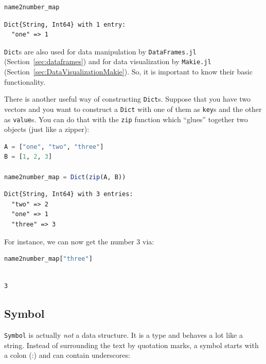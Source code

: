 \documentclass[
  notoc %
]{tufte-book}
\newcommand{\passthrough}[1]{#1}
\begin{document}
\begin{lstlisting}[language=Julia]
name2number_map
\end{lstlisting}

\begin{lstlisting}[language=Output]
Dict{String, Int64} with 1 entry:
  "one" => 1
\end{lstlisting}

\passthrough{\lstinline!Dict!}s are also used for data manipulation by
\passthrough{\lstinline!DataFrames.jl!} (Section~\ref{sec:dataframes})
and for data visualization by \passthrough{\lstinline!Makie.jl!}
(Section~\ref{sec:DataVisualizationMakie}). So, it is important to know
their basic functionality.

There is another useful way of constructing
\passthrough{\lstinline!Dict!}s. Suppose that you have two vectors and
you want to construct a \passthrough{\lstinline!Dict!} with one of them
as \passthrough{\lstinline!key!}s and the other as
\passthrough{\lstinline!value!}s. You can do that with the
\passthrough{\lstinline!zip!} function which ``glues'' together two
objects (just like a zipper):

\begin{lstlisting}[language=Julia]
A = ["one", "two", "three"]
B = [1, 2, 3]

name2number_map = Dict(zip(A, B))
\end{lstlisting}

\begin{lstlisting}[language=Output]
Dict{String, Int64} with 3 entries:
  "two" => 2
  "one" => 1
  "three" => 3
\end{lstlisting}

For instance, we can now get the number 3 via:

\begin{lstlisting}[language=Julia]
name2number_map["three"]
\end{lstlisting}

\begin{lstlisting}[language=Output]

3

\end{lstlisting}

\hypertarget{sec:symbol}{%
\subsection{Symbol}\label{sec:symbol}}

\passthrough{\lstinline!Symbol!} is actually \emph{not} a data
structure. It is a type and behaves a lot like a string. Instead of
surrounding the text by quotation marks, a symbol starts with a colon
(:) and can contain underscores:
\end{document}
